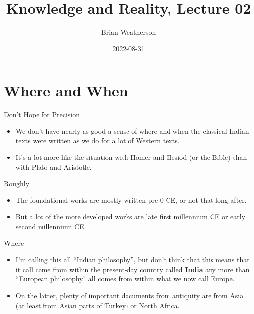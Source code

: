 \documentclass[
  17pt,
  letterpaper,
  ignorenonframetext,
  aspectratio=169,
  handout]{beamer}
\title{Knowledge and Reality, Lecture 02}
\author{Brian Weatherson}
\date{2022-08-31}
\providecommand{\tightlist}{%
  \setlength{\itemsep}{0pt}\setlength{\parskip}{0pt}}\usepackage{longtable,booktabs,array}
\begin{document}
\frame{\titlepage}
\ifdefined\Shaded\renewenvironment{Shaded}{\begin{tcolorbox}[interior hidden, borderline west={3pt}{0pt}{shadecolor}, enhanced, sharp corners, breakable, frame hidden, boxrule=0pt]}{\end{tcolorbox}}\fi

\hypertarget{where-and-when}{%
\section{Where and When}\label{where-and-when}}

\begin{frame}{Don't Hope for Precision}
\protect\hypertarget{dont-hope-for-precision}{}
\begin{itemize}[<+->]
\tightlist
\item
  We don't have nearly as good a sense of where and when the classical
  Indian texts were written as we do for a lot of Western texts.
\item
  It's a lot more like the situation with Homer and Hesiod (or the
  Bible) than with Plato and Aristotle.
\end{itemize}
\end{frame}

\begin{frame}{Roughly}
\protect\hypertarget{roughly}{}
\begin{itemize}[<+->]
\tightlist
\item
  The foundational works are mostly written pre 0 CE, or not that long
  after.
\item
  But a lot of the more developed works are late first millennium CE or
  early second millennium CE.
\end{itemize}
\end{frame}

\begin{frame}{Where}
\protect\hypertarget{where}{}
\begin{itemize}[<+->]
\tightlist
\item
  I'm calling this all ``Indian philosophy'', but don't think that this
  means that it call came from within the present-day country called
  \textbf{India} any more than ``European philosophy'' all comes from
  within what we now call Europe.
\item
  On the latter, plenty of important documents from antiquity are from
  Asia (at least from Asian parts of Turkey) or North Africa.
\end{itemize}
\end{frame}
\end{document}
